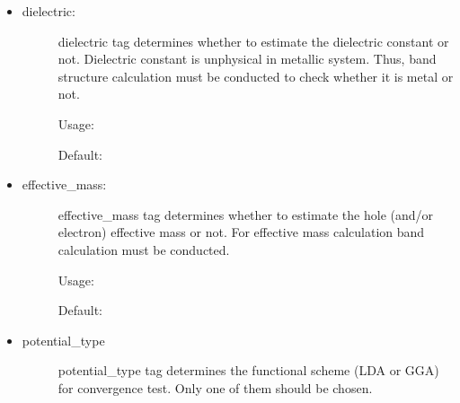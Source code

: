 \documentclass[letterpaper,10pt,english]{sphinxmanual}
\begin{document}
\begin{itemize}
\item {} \begin{description}
\item[{dielectric:}] \leavevmode
dielectric tag determines whether to estimate the dielectric constant or not. Dielectric constant is
unphysical in metallic system. Thus, band structure calculation must be conducted to check whether
it is metal or not.

Usage:

\begin{sphinxVerbatim}[commandchars=\\\{\}]
     
\end{sphinxVerbatim}

Default:

\begin{sphinxVerbatim}[commandchars=\\\{\}]
   
\end{sphinxVerbatim}

\end{description}

\item {} \begin{description}
\item[{effective\_mass:}] \leavevmode
effective\_mass tag determines whether to estimate the hole (and/or electron) effective mass or not.
For effective mass calculation band calculation must be conducted.

Usage:

\begin{sphinxVerbatim}[commandchars=\\\{\}]
     
\end{sphinxVerbatim}

Default:

\begin{sphinxVerbatim}[commandchars=\\\{\}]
   
\end{sphinxVerbatim}

\end{description}

\item {} \begin{description}
\item[{potential\_type}] \leavevmode
potential\_type tag determines the functional scheme (LDA or GGA) for convergence test. Only one of them should be chosen.


\end{description}
\end{itemize}
\end{document}
